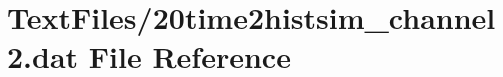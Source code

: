 \hypertarget{20time2histsim__channel2_8dat}{}\section{Text\+Files/20time2histsim\+\_\+channel2.dat File Reference}
\label{20time2histsim__channel2_8dat}
